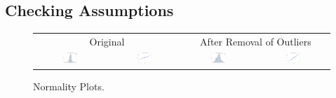 \documentclass[11pt]{scrartcl} %
\begin{document}
\subsection{Checking Assumptions}
\begin{figure}[h] %
	\centering
	\begin{tabular}{p{} p{}p{}p{}}
\hline	
	\multicolumn{2}{|c|}{Original} &  \multicolumn{2}{|c|}{After Removal of Outliers} \\
		\multicolumn{1}{|c}{\includegraphics[width=0.23\textwidth]{../graphics/A1Norm1}} &
		\multicolumn{1}{c|}{\includegraphics[width=0.23\textwidth]{../graphics/A1qq1}} &
		\multicolumn{1}{|c}{\includegraphics[width=0.23\textwidth]{../graphics/A1Norm2}} &
		\multicolumn{1}{c|}{\includegraphics[width=0.23\textwidth]{../graphics/A1qq2}}\\
		\hline
	\end{tabular}		
	\caption{Normality Plots.}
	\label{fig:A1QQ}
\end{figure}
\end{document}
